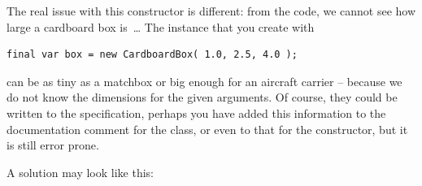 The real issue with this constructor is different: from the code, we cannot see how large a cardboard box is~… The instance that you create with
\begin{lstlisting}
final var box = new CardboardBox( 1.0, 2.5, 4.0 );
\end{lstlisting}
can be as tiny as a matchbox or big enough for an aircraft carrier – because we do not know the dimensions for the given arguments. Of course, they could be written to the specification, perhaps you have added this information to the documentation comment for the class, or even to that for the constructor, but it is still error prone.

A solution may look like this:
